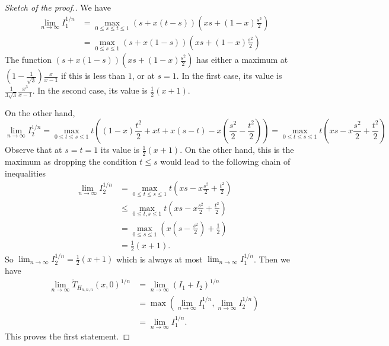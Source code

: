 \documentclass[10pt,a4paper]{amsart}
\newcommand{\wT}{\widetilde{T}}
\begin{document}
\begin{proof}[Sketch of the proof.]
We have
\begin{align*}
\lim_{n\to \infty}I_1^{1/n}&=\max_{0\leqslant s\leqslant   t\leqslant 1}(s+x(t-s))\left(xs+(1-x)\frac{s^2}{2}\right)\\
&=\max_{0\leqslant s\leqslant 1}(s+x(1-s))\left(xs+(1-x)\frac{s^2}{2}\right)
\end{align*}
The function $(s+x(1-s))\left(xs+(1-x)\frac{s^2}{2}\right)$ has either a maximum at $\left(1-\frac{1}{\sqrt{3}}\right)\frac{x}{x-1}$ if this is less than $1$, or at $s=1$. In the first case, its value is $\frac{1}{3\sqrt{3}}\frac{x^3}{x-1}$. In the second case,  its value is $\frac{1}{2}(x+1)$.

On the other hand,
$$\lim_{n\to \infty}I_2^{1/n}=\max_{0\leqslant   t\leqslant   s\leqslant   1}t\left((1-x)\frac{t^2}{2}+xt+x(s-t)-x\left(\frac{s^2}{2}-\frac{t^2}{2}\right)\right)=
\max_{0\leqslant   t\leqslant   s\leqslant   1} t\left(xs-x\frac{s^2}{2}+\frac{t^2}{2}\right)$$
Observe that at $s=t=1$ its value is $\frac{1}{2}(x+1)$. On the other hand, this is the maximum as  dropping the condition $t\leqslant s$ would lead to the following chain of inequalities
\begin{align*}
\lim_{n\to \infty}I_2^{1/n}&=\max_{0\leqslant t\leqslant s\leqslant 1} t\left(xs-x\frac{s^2}{2}+\frac{t^2}{2}\right)\\
&\leqslant \max_{0\leqslant t, s\leqslant 1} t\left(xs-x\frac{s^2}{2}+\frac{t^2}{2}\right)\\
&=\max_{0\leqslant s\leqslant 1}\left(x\left(s-\frac{s^2}{2}\right)+\frac{1}{2}\right)\\
&=\frac{1}{2}(x+1).
\end{align*}
So $\lim_{n\to \infty}I_2^{1/n}=\frac{1}{2}(x+1)$ which is always at most $\lim_{n\to \infty}I_1^{1/n}$. Then we have
\begin{align*}
\lim_{n\to \infty}\wT_{H_{n,n,n}}(x,0)^{1/n}&=\lim_{n\to \infty}(I_1+I_2)^{1/n}\\
&=\max\left(\lim_{n\to \infty}I_1^{1/n},\lim_{n\to \infty}I_2^{1/n}\right)\\
&=\lim_{n\to \infty}I_1^{1/n}.
\end{align*}
This proves the first statement. 


\end{proof}
\end{document}
